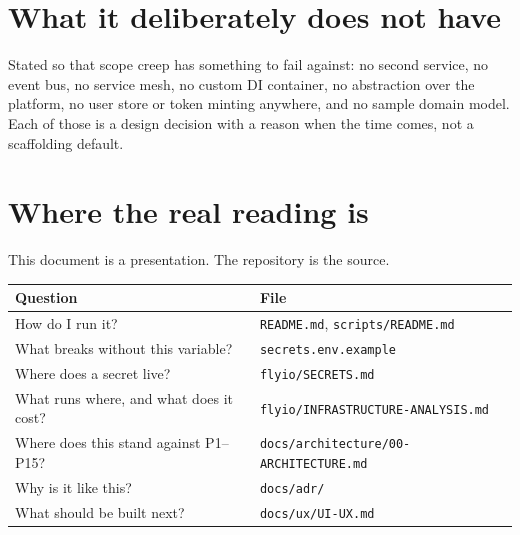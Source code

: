 \documentclass[11pt,a4paper]{article}
\begin{document}
\section{What it deliberately does not have}

Stated so that scope creep has something to fail against: no second service, no
event bus, no service mesh, no custom DI container, no abstraction over the
platform, no user store or token minting anywhere, and no sample domain model.
Each of those is a design decision with a reason when the time comes, not a
scaffolding default.

\section{Where the real reading is}

This document is a presentation. The repository is the source.

\begin{center}
\begin{tabular}{@{}ll@{}}
\toprule
\textbf{Question} & \textbf{File} \\
\midrule
How do I run it?                      & \texttt{README.md}, \texttt{scripts/README.md} \\
What breaks without this variable?    & \texttt{secrets.env.example} \\
Where does a secret live?             & \texttt{flyio/SECRETS.md} \\
What runs where, and what does it cost? & \texttt{flyio/INFRASTRUCTURE-ANALYSIS.md} \\
Where does this stand against P1--P15?  & \texttt{docs/architecture/00-ARCHITECTURE.md} \\
Why is it like this?                  & \texttt{docs/adr/} \\
What should be built next?            & \texttt{docs/ux/UI-UX.md} \\
\bottomrule
\end{tabular}
\end{center}
\end{document}
